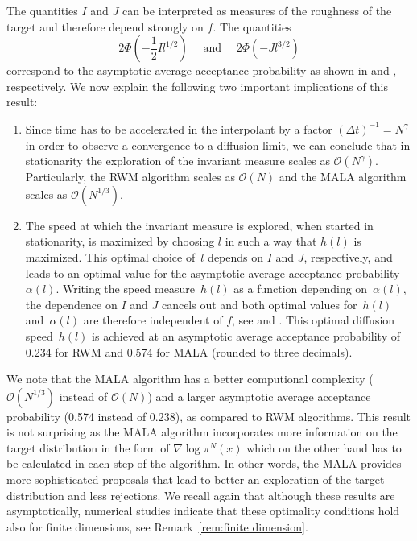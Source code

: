 The quantities $I$ and $J$ can be interpreted as measures of the roughness of the target and therefore depend strongly on $f$. The quantities 
\begin{equation}
 2 \Phi \left( - \frac{1}{2} I l^{1/2} \right) \quad \text{ and } \quad 2 \Phi \left( - J l^{3/2} \right)
\end{equation}
correspond to the asymptotic average acceptance probability as shown in \autocite{Roberts1997} and \autocite{Roberts1998}, respectively.
We now explain the following two important implications of this result:

\begin{enumerate}
 \item Since time has to be accelerated in the interpolant by a factor $ \left( \Delta t \right)^{-1} = N^{\gamma}$ in order to observe a convergence to a diffusion limit, we can conclude that in stationarity the exploration of the invariant measure scales as $ \mathcal{O}(N^{\gamma}) $. Particularly, the RWM algorithm scales as $ \mathcal{O}(N) $ and the MALA algorithm scales as $ \mathcal{O}(N^{1/3}) $.
 \item The speed at which the invariant measure is explored, when started in stationarity, is maximized by choosing $l$ in such a way that  $h(l)$ is maximized. This optimal choice of~$l$ depends on $I$ and $J$, respectively, and leads to an optimal value for the asymptotic average acceptance probability~$\alpha(l)$. Writing the speed measure~$h(l)$ as a function depending on~$\alpha(l)$, the dependence on $I$ and $J$ cancels out and both optimal values for~$h(l)$ and~$\alpha(l)$ are therefore independent of $f$, see \autocite{Roberts1997} and \autocite{Roberts1998}. This optimal diffusion speed~$h(l)$ is achieved at an asymptotic average acceptance probability of 0.234 for  RWM and 0.574 for MALA (rounded to three decimals).
\end{enumerate}

We note that the MALA algorithm has a better computional complexity ($ \mathcal{O}(N^{1/3}) $ instead of $ \mathcal{O}(N) $) and a larger asymptotic average acceptance probability (0.574 instead of 0.238), as compared to RWM algorithms. This result is not surprising as the MALA algorithm incorporates more information on the target distribution in the form of $ \nabla \log \pi^{N}(x) $ which on the other hand has to be calculated in each step of the algorithm. In other words, the MALA provides more sophisticated proposals that lead to better an exploration of the target distribution and less rejections. We recall again that although these results are asymptotically, numerical studies indicate that these optimality conditions hold also for finite dimensions, see Remark~\ref{rem:finite dimension}.

